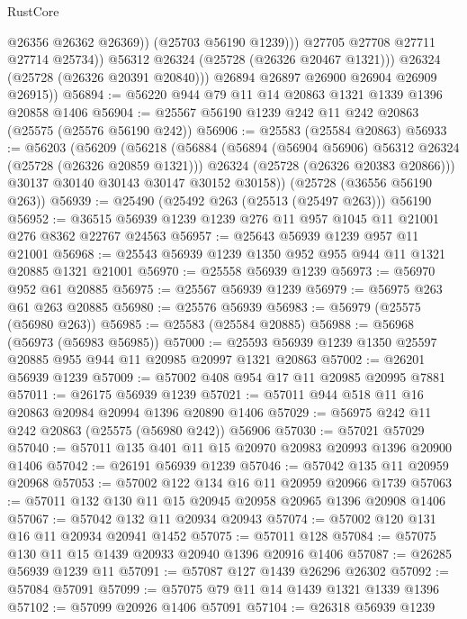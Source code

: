 \begin{lexlean}{RustCore}
\begin{coremodule}
                        @26356
                        @26362
                        @26369))
                    (@25703 @56190 @1239)))
                @27705
                @27708
                @27711
                @27714
                @25734))
            @56312
            @26324
            (@25728 (@26326 @20467 @1321)))
          @26324
          (@25728 (@26326 @20391 @20840)))
        @26894
        @26897
        @26900
        @26904
        @26909
        @26915))
@56894 := @56220 @944 @79 @11 @14 @20863 @1321 @1339 @1396 @20858 @1406
@56904 := @25567 @56190 @1239 @242 @11 @242 @20863 (@25575 (@25576 @56190 @242))
@56906 := @25583 (@25584 @20863)
@56933 := @56203
    (@56209
      (@56218
        (@56884
          (@56894 (@56904 @56906) @56312 @26324 (@25728 (@26326 @20859 @1321)))
          @26324
          (@25728 (@26326 @20383 @20866)))
        @30137
        @30140
        @30143
        @30147
        @30152
        @30158))
    (@25728 (@36556 @56190 @263))
@56939 := @25490 (@25492 @263 (@25513 (@25497 @263))) @56190
@56952 := @36515 @56939 @1239 @1239 @276 @11 @957 @1045 @11 @21001 @276 @8362 @22767 @24563
@56957 := @25643 @56939 @1239 @957 @11 @21001
@56968 := @25543 @56939 @1239 @1350 @952 @955 @944 @11 @1321 @20885 @1321 @21001
@56970 := @25558 @56939 @1239
@56973 := @56970 @952 @61 @20885
@56975 := @25567 @56939 @1239
@56979 := @56975 @263 @61 @263 @20885
@56980 := @25576 @56939
@56983 := @56979 (@25575 (@56980 @263))
@56985 := @25583 (@25584 @20885)
@56988 := @56968 (@56973 (@56983 @56985))
@57000 := @25593 @56939 @1239 @1350 @25597 @20885 @955 @944 @11 @20985 @20997 @1321 @20863
@57002 := @26201 @56939 @1239
@57009 := @57002 @408 @954 @17 @11 @20985 @20995 @7881
@57011 := @26175 @56939 @1239
@57021 := @57011 @944 @518 @11 @16 @20863 @20984 @20994 @1396 @20890 @1406
@57029 := @56975 @242 @11 @242 @20863 (@25575 (@56980 @242)) @56906
@57030 := @57021 @57029
@57040 := @57011 @135 @401 @11 @15 @20970 @20983 @20993 @1396 @20900 @1406
@57042 := @26191 @56939 @1239
@57046 := @57042 @135 @11 @20959 @20968
@57053 := @57002 @122 @134 @16 @11 @20959 @20966 @1739
@57063 := @57011 @132 @130 @11 @15 @20945 @20958 @20965 @1396 @20908 @1406
@57067 := @57042 @132 @11 @20934 @20943
@57074 := @57002 @120 @131 @16 @11 @20934 @20941 @1452
@57075 := @57011 @128
@57084 := @57075 @130 @11 @15 @1439 @20933 @20940 @1396 @20916 @1406
@57087 := @26285 @56939 @1239 @11
@57091 := @57087 @127 @1439 @26296 @26302
@57092 := @57084 @57091
@57099 := @57075 @79 @11 @14 @1439 @1321 @1339 @1396
@57102 := @57099 @20926 @1406 @57091
@57104 := @26318 @56939 @1239

\end{coremodule}
\end{lexlean}
